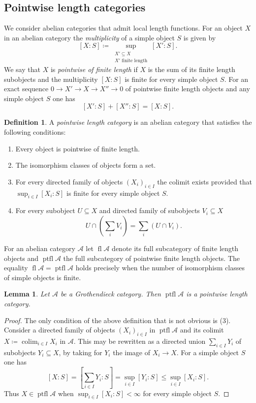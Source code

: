 \documentclass[a4paper]{amsart}
\theoremstyle{plain}
\newtheorem{lem}[thm]{Lemma}
\theoremstyle{definition}
\newtheorem{defn}[thm]{Definition}
\theoremstyle{remark}
\numberwithin{equation}{section}
\newcommand{\colim}{\operatorname*{colim}}
\newcommand{\fl}{\operatorname{fl}}
\newcommand{\ptfl}{\operatorname{ptfl}}
\def\A{\mathcal A}
\begin{document}
\subsection*{Pointwise length categories}

We consider  abelian categories that admit local length
functions. For an object $X$ in an abelian category the
\emph{multiplicity} of a simple object $S$ is given by
\[ [X:S]\coloneqq \sup_{\substack{X'\subseteq X\\ X' \text{ finite
        length}}}[X':S].\] We say that $X$ is \emph{pointwise of
  finite length} if $X$ is the sum of its finite length subobjects and
the multiplicity $[X:S]$ is finite for every simple object $S$.  For
an exact sequence $0\to X'\to X\to X''\to 0$ of pointwise finite
length objects and any simple object $S$ one has
\[ [X':S]+ [X'':S]= [X:S].\]

\begin{defn}\label{de:ptw}
  A \emph{pointwise length category} is an abelian category that satisfies
  the following conditions:
\begin{enumerate}
\item Every object is pointwise of finite length.
\item The isomorphism classes of objects form a set.  
\item For every directed family of objects $(X_i)_{i\in I}$ the
  colimit exists provided that $\sup_{i\in I} [X_i:S]$ is finite for
  every simple object $S$.
\item For every subobject $U\subseteq X$ and directed family of
  subobjects $V_i\subseteq X$
  \[U\cap\left(\sum_i V_i\right)=\sum_i (U\cap V_i).\]  
\end{enumerate}
\end{defn}

For an abelian category $\A$ let $\fl\A$ denote its full subcategory
of finite length objects and $\ptfl\A$ the full subcategory of
pointwise finite length objects. The equality $\fl\A=\ptfl\A$ holds
precisely when the number of isomorphism classes of simple objects is
finite.

\begin{lem}
  Let $\A$ be a Grothendieck category. Then  $\ptfl\A$ is  a pointwise
  length category.
\end{lem}
\begin{proof}
  The only condition of the above definition that is not obvious is
  (3). Consider a directed family of objects $(X_i)_{i\in I}$ in
  $\ptfl\A$ and its colimit $X\coloneqq\colim_{i\in I}X_i$ in
  $\A$. This may be rewritten as a directed union $\sum_{i\in I}Y_i$
  of subobjects $Y_i\subseteq X$, by taking for $Y_i$ the image of
  $X_i\to X$. For a simple object $S$ one has
  \[[X:S]=\left[\sum_{i\in I}Y_i:S\right]=\sup_{i\in I} [Y_i:S]\le
    \sup_{i\in I} [X_i:S].\] Thus $X\in\ptfl\A$ when
  $\sup_{i\in I} [X_i:S]<\infty$ for every simple object $S$.
\end{proof}  
  
\end{document}
